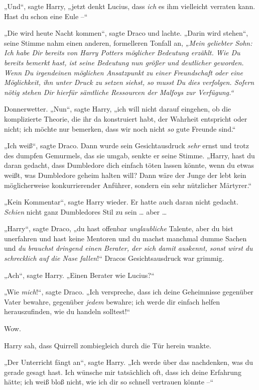 {„Und“, sagte Harry, „jetzt denkt Lucius, dass \emph{ich} es ihm vielleicht verraten kann. Hast du schon eine Eule --“

„Die wird heute Nacht kommen“, sagte Draco und lachte. „Darin wird stehen“, seine Stimme nahm einen anderen, formelleren Tonfall an, \emph{„Mein geliebter Sohn: Ich habe Dir bereits von Harry Potters möglicher Bedeutung erzählt. Wie Du bereits bemerkt hast, ist seine Bedeutung nun größer und deutlicher geworden. Wenn Du irgendeinen möglichen Ansatzpunkt zu einer Freundschaft oder eine Möglichkeit, ihn unter Druck zu setzen siehst, so musst Du dies verfolgen. Sofern nötig stehen Dir hierfür sämtliche Ressourcen der Malfoys zur Verfügung.“}

Donnerwetter. „Nun“, sagte Harry, „ich will nicht darauf eingehen, ob die komplizierte Theorie, die ihr da konstruiert habt, der Wahrheit entspricht oder nicht; ich möchte nur bemerken, dass wir noch nicht \emph{so} gute Freunde sind.“

„Ich weiß“, sagte Draco. Dann wurde sein Gesichtausdruck \emph{sehr} ernst und trotz des dumpfen Gemurmels, das sie umgab, senkte er seine Stimme. „Harry, hast du daran gedacht, dass Dumbledore dich einfach töten lassen könnte, wenn du etwas weißt, was Dumbledore geheim halten will? Dann wäre der Junge der lebt kein möglicherweise konkurrierender Anführer, sondern ein sehr nützlicher Märtyrer.“

„Kein Kommentar“, sagte Harry wieder. Er hatte auch daran nicht gedacht. \emph{Schien} nicht ganz Dumbledores Stil zu sein … aber …

„Harry“, sagte Draco, „du hast offenbar \emph{unglaubliche} Talente, aber du bist unerfahren und hast keine Mentoren und du machst manchmal dumme Sachen und \emph{du brauchst dringend einen Berater, der sich damit auskennt, sonst wirst du schrecklich auf die Nase fallen}!“ Dracos Gesichtsausdruck war grimmig.

„Ach“, sagte Harry. „Einen Berater wie Lucius?“

„Wie \emph{mich}!“, sagte Draco. „Ich verspreche, dass ich deine Geheimnisse gegenüber Vater bewahre, gegenüber \emph{jedem} bewahre; ich werde dir einfach helfen herauszufinden, wie du handeln solltest!“

Wow.

Harry sah, dass Quirrell zombiegleich durch die Tür herein wankte.

„Der Unterricht fängt an“, sagte Harry. „Ich werde über das nachdenken, was du gerade gesagt hast. Ich wünsche mir tatsächlich oft, dass ich deine Erfahrung hätte; ich weiß bloß nicht, wie ich dir so schnell vertrauen könnte --“

}

